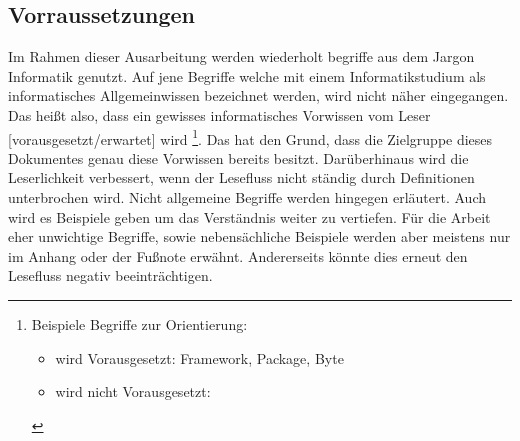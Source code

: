 \subsection{Vorraussetzungen} \myCheckmark
Im Rahmen dieser Ausarbeitung werden wiederholt begriffe aus dem Jargon Informatik genutzt. Auf jene Begriffe welche mit einem Informatikstudium als informatisches Allgemeinwissen bezeichnet werden, wird nicht näher eingegangen. Das heißt also, dass ein gewisses informatisches Vorwissen vom Leser [vorausgesetzt/erwartet] wird%
\footnote{Beispiele Begriffe zur Orientierung:
	\begin{itemize}[noitemsep,topsep=0pt,parsep=0pt,partopsep=0pt]
		\item wird Vorausgesetzt: Framework, Package, Byte
		\item wird nicht Vorausgesetzt: \myTodo %
	\end{itemize}
	\nointerlineskip %
}. \newline%
Das hat den Grund, dass die Zielgruppe dieses Dokumentes genau diese Vorwissen bereits besitzt. Darüberhinaus wird die Leserlichkeit verbessert, wenn der Lesefluss nicht ständig durch Definitionen unterbrochen wird. \newline%
Nicht allgemeine Begriffe werden hingegen erläutert. Auch wird es Beispiele geben um das Verständnis weiter zu vertiefen.\newline%
Für die Arbeit eher unwichtige Begriffe, sowie nebensächliche Beispiele werden aber meistens nur im Anhang oder der Fußnote erwähnt. Andererseits könnte dies erneut den Lesefluss negativ beeinträchtigen.
